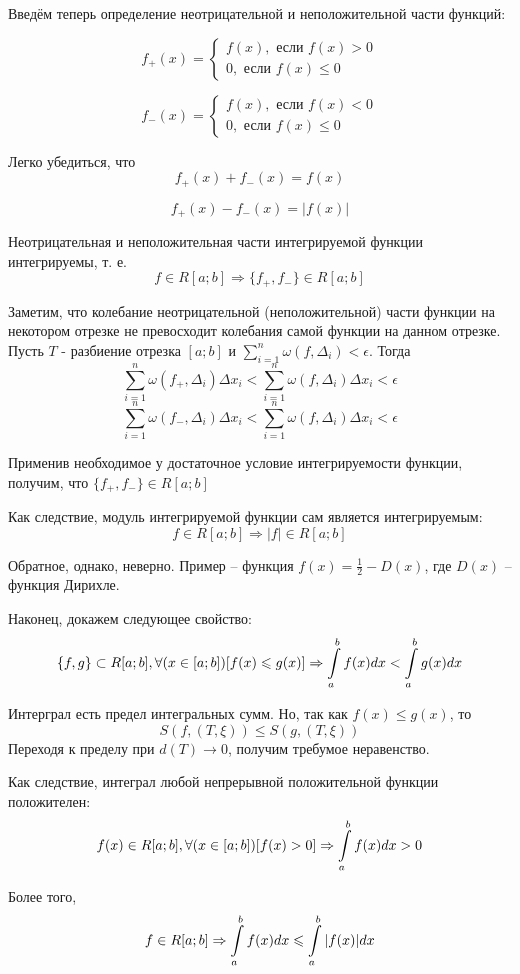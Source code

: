Введём теперь определение неотрицательной и неположительной части функций:

\begin{opr}
$$
f_+(x)=\left\{
\begin{array}{l}
f(x), \mbox{~если~} f(x) > 0 \\
0,    \mbox{~если~} f(x) \leq 0
\end{array}
\right.
$$
\end{opr}


\begin{opr}
$$
f_-(x)=\left\{
\begin{array}{l}
f(x), \mbox{~если~} f(x) < 0 \\
0,    \mbox{~если~} f(x) \leq 0
\end{array}
\right.
$$
\end{opr}

Легко убедиться, что
$$
f_+(x)+f_-(x)=f(x)
$$

$$
f_+(x)-f_-(x)=|f(x)|
$$

Неотрицательная и неположительная части интегрируемой функции интегрируемы, т. е.
$$
f\in R[a;b] \Rightarrow \{f_+,f_-\}\in R[a;b]
$$

\dokvo

Заметим, что колебание неотрицательной (неположительной) части функции на некотором отрезке не превосходит колебания самой функции на данном отрезке.
Пусть $T$ - разбиение отрезка $[a;b]$ и ${\sum\limits_{i=1}^n \omega(f,\Delta_i)<\epsilon}$.
Тогда
$$\sum\limits_{i=1}^n \omega(f_+,\Delta_i)\Delta x_i <\sum\limits_{i=1}^n \omega(f,\Delta_i)\Delta x_i <\epsilon$$
$$\sum\limits_{i=1}^n \omega(f_-,\Delta_i)\Delta x_i <\sum\limits_{i=1}^n \omega(f,\Delta_i)\Delta x_i <\epsilon$$

Применив необходимое у достаточное условие интегрируемости функции, получим, что $\{f_+,f_-\}\in R[a;b]$

Как следствие, модуль интегрируемой функции сам является интегрируемым:
$$
f \in R[a;b] \Rightarrow |f| \in R[a;b] 
$$

Обратное, однако, неверно.
Пример -- функция $f(x)=\frac{1}{2}-D(x)$, где $D(x)$ -- функция Дирихле.

Наконец, докажем следующее свойство:
$$
\{f,g\}\subset R[a;b], \forall(x\in[a;b])[f(x)\leqslant g(x)] \Rightarrow \int\limits_a^b f(x)dx < \int\limits_a^b g(x) dx
$$

\dokvo

Интерграл есть предел интегральных сумм.
Но, так как $f(x)\leq g(x)$, то
$$
S(f,(T,\xi))\leq S(g,(T,\xi))
$$
Переходя к пределу при $d(T)\to 0$, получим требумое неравенство.

\dokno

Как следствие, интеграл любой непрерывной положительной функции положителен:
$$
f(x)\in R[a;b], \forall(x\in[a;b])[f(x)>0] \Rightarrow \int\limits_a^b f(x) dx > 0
$$

Более того,
$$
f\in R[a;b] \Rightarrow \int\limits_a^b f(x) dx \leqslant \int\limits_a^b |f(x)| dx 
$$
